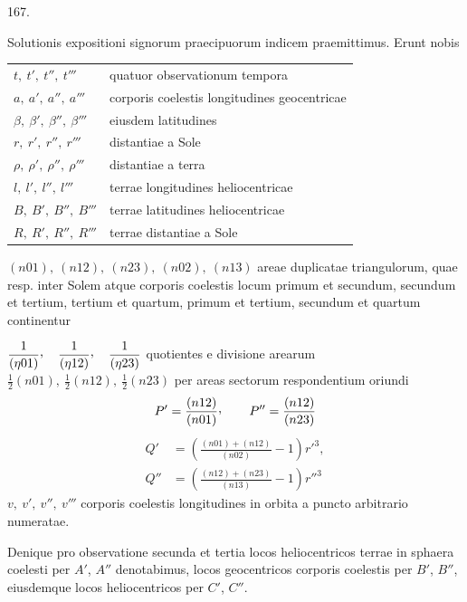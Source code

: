 \par{}\medskip
\begin{center}\hypertarget{native-230-article167}{}167.\end{center}
Solutionis expositioni signorum praecipuorum indicem praemittimus. Erunt nobis
\par\noindent
\begin{tabular}{@{}ll@{}}
$t,\ t',\ t'',\ t'''$ & quatuor observationum tempora\\
$a,\ a',\ a'',\ a'''$ & corporis coelestis longitudines geocentricae\\
$\beta,\ \beta',\ \beta'',\ \beta'''$ & eiusdem latitudines\\
$r,\ r',\ r'',\ r'''$ & distantiae a Sole\\
$\rho,\ \rho',\ \rho'',\ \rho'''$ & distantiae a terra\\
$l,\ l',\ l'',\ l'''$ & terrae longitudines heliocentricae\\
$B,\ B',\ B'',\ B'''$ & terrae latitudines heliocentricae\\
$R,\ R',\ R'',\ R'''$ & terrae distantiae a Sole
\end{tabular}
\par\noindent{}
$(n01),\ (n12),\ (n23),\ (n02),\ (n13)$ areae duplicatae triangulorum, quae resp.
inter Solem atque corporis coelestis locum primum et secundum,
secundum et tertium, tertium et quartum, primum et tertium, secundum et quartum continentur
\par\noindent
$\dfrac{1}{(\eta01)}\mathpunct{\raisebox{.45ex}{,}}\quad
\dfrac{1}{(\eta12)}\mathpunct{\raisebox{.45ex}{,}}\quad
\dfrac{1}{(\eta23)}$ quotientes e divisione arearum
\newline
$\frac12(n01),\ \frac12(n12),\ \frac12(n23)$
per areas sectorum respondentium oriundi
\[
P'=\frac{(n12)}{(n01)}\mathpunct{\raisebox{.45ex}{,}}\qquad
P''=\frac{(n12)}{(n23)}
\]
\[
\begin{aligned}
Q'&=\left(\frac{(n01)+(n12)}{(n02)}-1\right)r'^3,\\[.5em]
Q''&=\left(\frac{(n12)+(n23)}{(n13)}-1\right)r''^3
\end{aligned}
\]
\noindent $v,\ v',\ v'',\ v'''$ corporis coelestis longitudines in orbita a puncto arbitrario numeratae.
\par
Denique pro observatione secunda et tertia locos heliocentricos terrae in
sphaera coelesti per $A'$, $A''$ denotabimus, locos geocentricos corporis coelestis
per $B'$, $B''$, eiusdemque locos heliocentricos per $C'$, $C''$.
